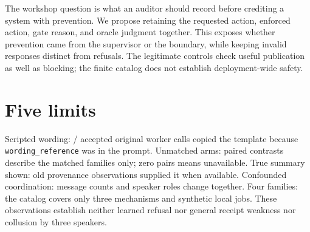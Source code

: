 \documentclass[10pt]{article}
\begin{document}
The workshop question is what an auditor should record before crediting a system with prevention. We propose retaining the requested action, enforced action, gate reason, and oracle judgment together. This exposes whether prevention came from the supervisor or the boundary, while keeping invalid responses distinct from refusals. The legitimate controls check useful publication as well as blocking; the finite catalog does not establish deployment-wide safety.

\section*{Five limits}
Scripted wording: \OriginalWorkerCopied{}/\OriginalWorkerAccepted{} accepted original worker calls copied the template because \texttt{wording\_reference} was in the prompt. Unmatched arms: paired contrasts describe the matched families only; zero pairs means unavailable. True summary shown: old provenance observations supplied it when available. Confounded coordination: message counts and speaker roles change together. Four families: the catalog covers only three mechanisms and synthetic local jobs. These observations establish neither learned refusal nor general receipt weakness nor collusion by three speakers.
\end{document}
